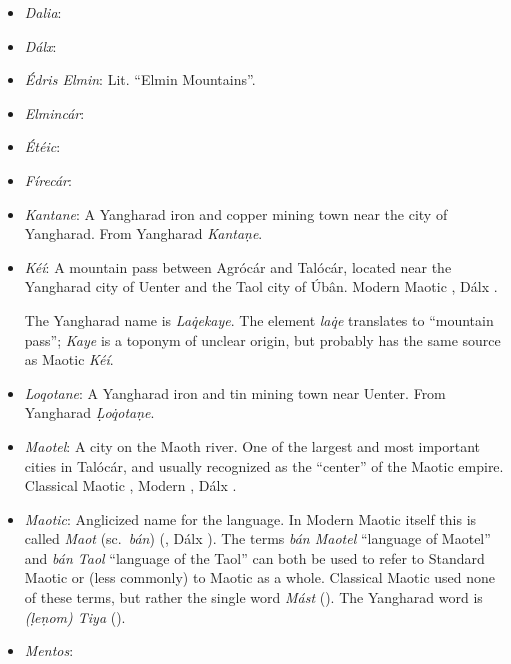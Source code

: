 \documentclass{article}
\begin{document}
\begin{itemize}
 \item \textit{Dalia}:

 \item \textit{Dálx}:

 \item \textit{Édris Elmin}: Lit. ``Elmin Mountains''.

 \item \textit{Elmincár}:

 \item \textit{Étéic}:

 \item \textit{Fírecár}:

 \item \textit{Kantane}: A Yangharad iron and copper mining town near the city of Yangharad. From Yangharad \textit{Kanta\d{n}e}.

 \item \textit{Kéí}: A mountain pass between Agrócár and Talócár, located near the Yangharad city of Uenter and the Taol city of Úbân. Modern Maotic , Dálx .

 The Yangharad name is \textit{La\.{q}ekaye}. The element \textit{la\.{q}e} translates to ``mountain pass''; \textit{Kaye} is a toponym of unclear origin, but probably has the same source as Maotic \textit{Kéí}.

 \item \textit{Loqotane}: A Yangharad iron and tin mining town near Uenter. From Yangharad \textit{\d{L}o\.{q}ota\d{n}e}.

 \item \textit{Maotel}: A city on the Maoth river. One of the largest and most important cities in Talócár, and usually recognized as the ``center'' of the Maotic empire. Classical Maotic , Modern , Dálx .

 \item \textit{Maotic}: Anglicized name for the language. In Modern Maotic itself this is called \textit{Maot} (sc.\ \textit{bán}) (, Dálx ). The terms \textit{bán Maotel} ``language of Maotel'' and \textit{bán Taol} ``language of the Taol'' can both be used to refer to Standard Maotic or (less commonly) to Maotic as a whole. Classical Maotic used none of these terms, but rather the single word \textit{Mást} (). The Yangharad word is \textit{(\d{l}e\d{n}om) Tiya} ().

 \item \textit{Mentos}:


\end{itemize}
\end{document}
